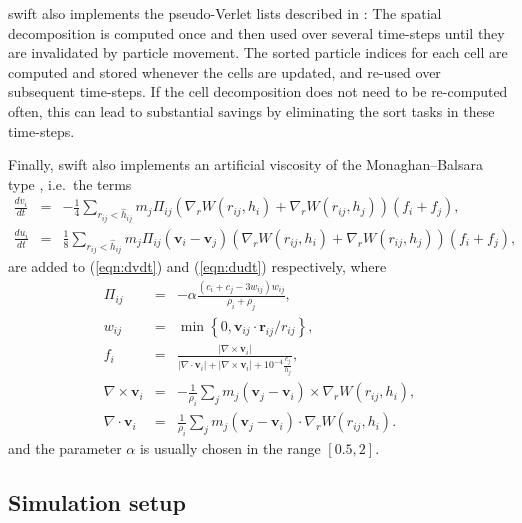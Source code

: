 \documentclass[final]{siamltex}
\newcommand{\eqn}[1]
    {(\ref{eqn:#1})}
\newcommand{\swift}
    {{\sc swift}\xspace}
\begin{document}
\swift also implements the pseudo-Verlet lists described in
\cite{ref:Gonnet2013}: The spatial decomposition is computed once
and then used over several time-steps until they are invalidated
by particle movement.
The sorted particle indices for each cell are computed and stored
whenever the cells are updated, and re-used over subsequent time-steps.
If the cell decomposition does not need to be re-computed often,
this can lead to substantial savings by eliminating the sort tasks
in these time-steps.

Finally, \swift also implements an artificial viscosity of the
Monaghan--Balsara type \cite{ref:Monaghan1983,ref:Balsara1995},
i.e.~the terms
%
\begin{eqnarray*}
    \frac{dv_i}{dt} & = & -\frac{1}{4}\sum_{r_{ij} < \hat{h}_{ij}} m_j \Pi_{ij} \left({\nabla_r}W({r}_{ij},
    h_i)+{\nabla_r}W({r}_{ij}, h_j)\right) (f_i+f_j),\\
    \frac{du_i}{dt} & = & \frac{1}{8} \sum_{r_{ij} < \hat{h}_{ij}} m_j \Pi_{ij}(\mathbf{v}_i - \mathbf{v}_j)
    \left({\nabla_r}W({r}_{ij},
    h_i)+{\nabla_r}W({r}_{ij}, h_j)\right) (f_i+f_j),
\end{eqnarray*}
%
are added to \eqn{dvdt} and \eqn{dudt} respectively, where
%
\begin{eqnarray*}
    \Pi_{ij} &=& -\alpha \frac{\left(c_i + c_j - 3w_{ij}\right)w_{ij}}{\rho_i + \rho_j}, \\
    w_{ij} &=& \min\left\{0, \mathbf{v}_{ij}\cdot\mathbf{r}_{ij} / r_{ij}\right\}, \\
    f_i &=& \frac{|\nabla \times \mathbf{v}_i|}{|\nabla \cdot \mathbf{v}_i| + |\nabla \times \mathbf{v}_i| +
    10^{-4}\frac{c_j}{h_j}}, \\
    \nabla \times \mathbf{v}_i &=& -\frac{1}{\rho_i}\sum_j m_j (\mathbf{v}_j - \mathbf{v}_i)\times
    {\nabla_r}W({r}_{ij}, h_i), \\
    \nabla \cdot \mathbf{v}_i &=& \frac{1}{\rho_i}\sum_j m_j (\mathbf{v}_j - \mathbf{v}_i)\cdot {\nabla_r}W({r}_{ij},
    h_i).
\end{eqnarray*}
%
and the parameter $\alpha$ is usually chosen in the range $[0.5,2]$.


\subsection{Simulation setup}
\end{document}
